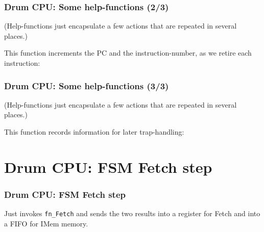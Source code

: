 
\begin{frame}[fragile]
\frametitle{Drum CPU: Some help-functions (2/3)}

\footnotesize

(Help-functions just encapsulate a few actions that are repeated in several places.)

\vspace{5ex}

This function increments the PC and the instruction-number, as we retire each instruction:

\vspace{4ex}

\begin{minipage}{0.725\textwidth}
\end{minipage}

\end{frame}


\begin{frame}[fragile]
\frametitle{Drum CPU: Some help-functions (3/3)}

\footnotesize

(Help-functions just encapsulate a few actions that are repeated in several places.)

\vspace{5ex}

This function records information for later trap-handling:

\vspace{4ex}

\begin{minipage}{0.725\textwidth}
\end{minipage}

\end{frame}


\section{Drum CPU: FSM Fetch step}


\begin{frame}[fragile]
\frametitle{Drum CPU: FSM Fetch step}

\footnotesize

\begin{minipage}{0.75\textwidth}
\end{minipage}
\hm
\begin{minipage}{0.2\textwidth}
 Just invokes {\tt fn\_Fetch} and sends the two results into a register for Fetch and
 into a FIFO for IMem memory.
\end{minipage}

\end{frame}

